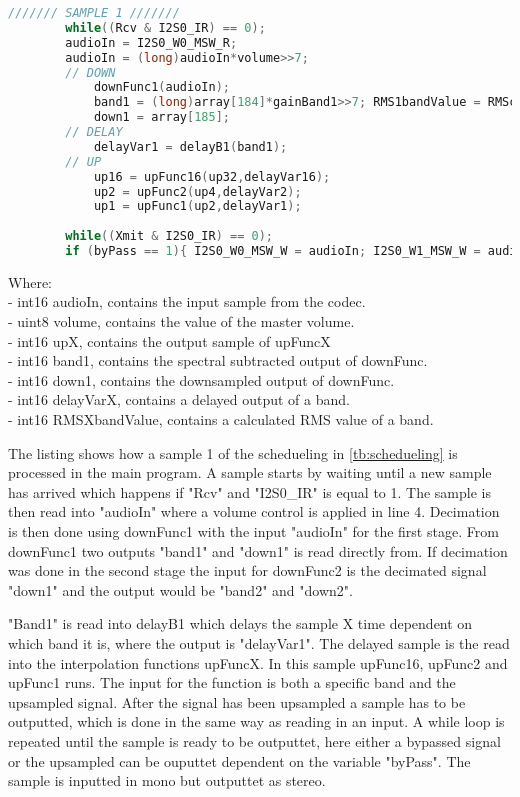 \begin{lstlisting}[language=C, caption = {Sample 1},label={listingSample}]
/////// SAMPLE 1 ///////
    	while((Rcv & I2S0_IR) == 0); 							
	    audioIn = I2S0_W0_MSW_R;  
	    audioIn = (long)audioIn*volume>>7;	
	    // DOWN
		    downFunc1(audioIn); 			
			band1 = (long)array[184]*gainBand1>>7; RMS1bandValue = RMScalculate(RMS1bandBuffer,band1,&RMS1bandPtr, &RMS1bandSum);				
			down1 = array[185];							
		// DELAY			
			delayVar1 = delayB1(band1);
		// UP
			up16 = upFunc16(up32,delayVar16);
			up2 = upFunc2(up4,delayVar2);
			up1 = upFunc1(up2,delayVar1);
		
	    while((Xmit & I2S0_IR) == 0);  					
		if (byPass == 1){ I2S0_W0_MSW_W = audioIn; I2S0_W1_MSW_W = audioIn;} else { I2S0_W0_MSW_W = up1; I2S0_W1_MSW_W = up1;} 
\end{lstlisting}
Where: \\
- int16 audioIn, contains the input sample from the codec. \\
- uint8 volume, contains the value of the master volume. \\
- int16 upX, contains the output sample of upFuncX \\
- int16 band1, contains the spectral subtracted output of downFunc. \\
- int16 down1, contains the downsampled output of downFunc. \\
- int16 delayVarX, contains a delayed output of a band. \\
- int16 RMSXbandValue, contains a calculated RMS value of a band.

The listing shows how a sample 1 of the schedueling in \autoref{tb:schedueling} is processed in the main program. A sample starts by waiting until a new sample has arrived which happens if "Rcv" and "I2S0\_IR" is equal to 1. The sample is then read into "audioIn" where a volume control is applied in line 4. Decimation is then done using downFunc1 with the input "audioIn" for the first stage. From downFunc1 two outputs "band1" and "down1" is read directly from. If decimation was done in the second stage the input for downFunc2 is the decimated signal "down1" and the output would be "band2" and "down2".

"Band1" is read into delayB1 which delays the sample X time dependent on which band it is, where the output is "delayVar1". The delayed sample is the read into the interpolation functions upFuncX. In this sample upFunc16, upFunc2 and upFunc1 runs. The input for the function is both a specific band and the upsampled signal. After the signal has been upsampled a sample has to be outputted, which is done in the same way as reading in an input. A while loop is repeated until the sample is ready to be outputtet, here either a bypassed signal or the upsampled can be ouputtet dependent on the variable "byPass". The sample is inputted in mono but outputtet as stereo. 


